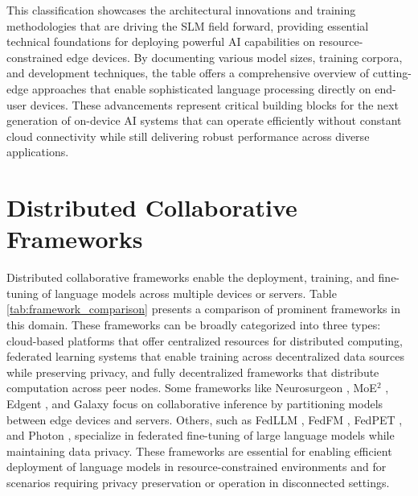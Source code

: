     This classification showcases the architectural innovations and training methodologies that are driving the SLM field forward, providing essential technical foundations for deploying powerful AI capabilities on resource-constrained edge devices. By documenting various model sizes, training corpora, and development techniques, the table offers a comprehensive overview of cutting-edge approaches that enable sophisticated language processing directly on end-user devices. These advancements represent critical building blocks for the next generation of on-device AI systems that can operate efficiently without constant cloud connectivity while still delivering robust performance across diverse applications.



\section{Distributed Collaborative Frameworks}
\label{app:distributed_collaborative_frameworks}
Distributed collaborative frameworks enable the deployment, training, and fine-tuning of language models across multiple devices or servers. Table \ref{tab:framework_comparison} presents a comparison of prominent frameworks in this domain. These frameworks can be broadly categorized into three types: cloud-based platforms that offer centralized resources for distributed computing, federated learning systems that enable training across decentralized data sources while preserving privacy, and fully decentralized frameworks that distribute computation across peer nodes. Some frameworks like Neurosurgeon \cite{kang2017neurosurgeon}, MoE$^2$ \cite{jin2025moe2}, Edgent \cite{li2018edgent}, and Galaxy \cite{ye2024galaxy} focus on collaborative inference by partitioning models between edge devices and servers. Others, such as FedLLM \cite{wu2024fedllm}, FedFM \cite{chen2024fedfm}, FedPET \cite{li2024fedpet}, and Photon \cite{sani2024photon}, specialize in federated fine-tuning of large language models while maintaining data privacy. These frameworks are essential for enabling efficient deployment of language models in resource-constrained environments and for scenarios requiring privacy preservation or operation in disconnected settings.

